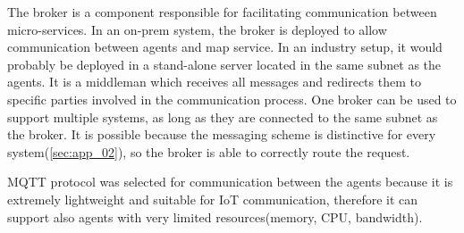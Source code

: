 The broker is a component responsible for facilitating communication between micro-services. In an on-prem system, the broker is deployed to allow communication between agents and map service. In an industry setup, it would probably be deployed in a stand-alone server located in the same subnet as the agents. It is a middleman which receives all messages and redirects them to specific parties involved in the communication process. One broker can be used to support multiple systems, as long as they are connected to the same subnet as the broker. It is possible because the messaging scheme is distinctive for every system(\ref{sec:app_02}), so the broker is able to correctly route the request.

MQTT protocol was selected for communication between the agents because it is extremely lightweight and suitable for IoT communication, therefore it can support also agents with very limited resources(memory, CPU, bandwidth).